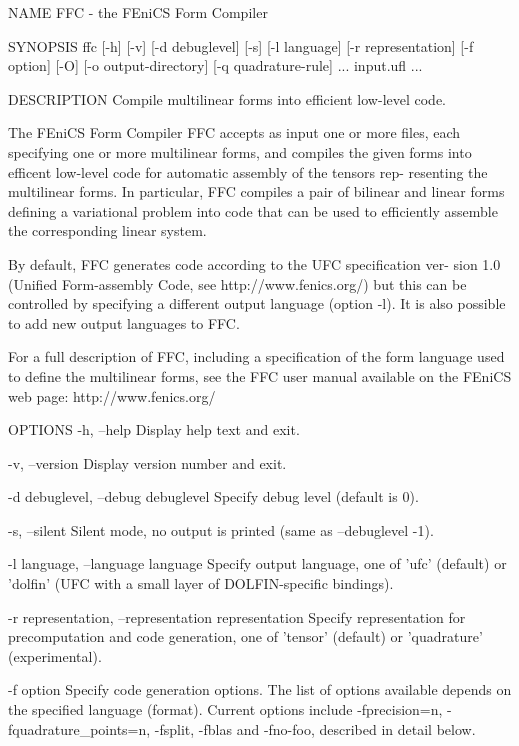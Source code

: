 NAME
       FFC - the FEniCS Form Compiler


SYNOPSIS
       ffc [-h] [-v] [-d debuglevel] [-s] [-l language] [-r representation]
       [-f option] [-O] [-o output-directory] [-q quadrature-rule] ...
       input.ufl ...


DESCRIPTION
       Compile multilinear forms into efficient low-level code.

       The FEniCS Form Compiler FFC accepts as input one or more  files,  each
       specifying  one or more multilinear forms, and compiles the given forms
       into efficent low-level code for automatic assembly of the tensors rep-
       resenting  the multilinear forms. In particular, FFC compiles a pair of
       bilinear and linear forms defining a variational problem into code that
       can be used to efficiently assemble the corresponding linear system.

       By  default, FFC generates code according to the UFC specification ver-
       sion 1.0 (Unified Form-assembly Code, see  http://www.fenics.org/)  but
       this  can  be  controlled  by  specifying  a  different output language
       (option -l). It is also possible to add new output languages to FFC.

       For a full description of FFC, including a specification  of  the  form
       language  used to define the multilinear forms, see the FFC user manual
       available on the FEniCS web page: http://www.fenics.org/


OPTIONS
       -h, --help
              Display help text and exit.

       -v, --version
              Display version number and exit.

       -d debuglevel, --debug debuglevel
              Specify debug level (default is 0).

       -s, --silent
              Silent mode, no output is printed (same as --debuglevel -1).

       -l language, --language language
              Specify output language, one of 'ufc' (default) or 'dolfin' (UFC
              with a small layer of DOLFIN-specific bindings).

       -r representation, --representation representation
              Specify  representation  for precomputation and code generation,
              one of 'tensor' (default) or 'quadrature' (experimental).

       -f option
              Specify  code generation options. The list of options available
              depends on the specified language (format). Current options
              include -fprecision=n, -fquadrature_points=n,
              -fsplit, -fblas and -fno-foo, described in detail
              below.

